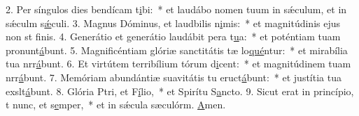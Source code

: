 2. Per síngulos dies bendícam t\uline{i}bi:~* et laudábo nomen tuum in sǽculum, et in sǽculm s\uline{ǽ}culi.
3. Magnus Dóminus, et laudbilis n\uline{i}mis:~* et magnitúdinis ejus non st f\uline{i}nis.
4. Generátio et generátio laudábit pera t\uline{u}a:~* et poténtiam tuam pronunt\uline{á}bunt.
5. Magnificéntiam glóriæ sanctitátis tæ lo\uline{qué}ntur:~* et mirabília tua nrr\uline{á}bunt.
6. Et virtútem terribílium tórum d\uline{i}cent:~* et magnitúdinem tuam nrr\uline{á}bunt.
7. Memóriam abundántiæ suavitátis tu eruct\uline{á}bunt:~* et justítia tua exslt\uline{á}bunt.
8. Glória Ptri, et F\uline{í}lio,~* et Spirítu S\uline{a}ncto.
9. Sicut erat in princípio, t nunc, et s\uline{e}mper,~* et in sǽcula sæculórm. \uline{A}men.
